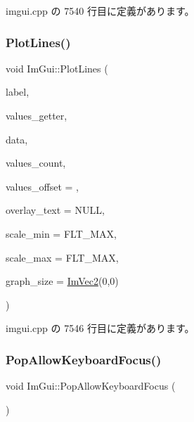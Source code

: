  imgui.\+cpp の 7540 行目に定義があります。

\mbox{\label{namespace_im_gui_a94a2645d45c96da35b834dc7db93a9f1}} 
\subsubsection{\texorpdfstring{Plot\+Lines()}{PlotLines()}\hspace{0.1cm}{\footnotesize\ttfamily [2/2]}}
{\footnotesize\ttfamily void Im\+Gui\+::\+Plot\+Lines (\begin{DoxyParamCaption}\item[{const char $\ast$}]{label,  }\item[{float($\ast$)(void $\ast$data, int idx)}]{values\+\_\+getter,  }\item[{void $\ast$}]{data,  }\item[{int}]{values\+\_\+count,  }\item[{int}]{values\+\_\+offset = {},  }\item[{const char $\ast$}]{overlay\+\_\+text = {\ttfamily NULL},  }\item[{float}]{scale\+\_\+min = {\ttfamily FLT\+\_\+MAX},  }\item[{float}]{scale\+\_\+max = {\ttfamily FLT\+\_\+MAX},  }\item[{\mbox{\hyperlink{struct_im_vec2}{Im\+Vec2}}}]{graph\+\_\+size = {\ttfamily \mbox{\hyperlink{struct_im_vec2}{Im\+Vec2}}(0,0)} }\end{DoxyParamCaption})}



 imgui.\+cpp の 7546 行目に定義があります。

\mbox{\label{namespace_im_gui_a017db69016de97685aec978e504dc96d}} 
\subsubsection{\texorpdfstring{Pop\+Allow\+Keyboard\+Focus()}{PopAllowKeyboardFocus()}}
{\footnotesize\ttfamily void Im\+Gui\+::\+Pop\+Allow\+Keyboard\+Focus (\begin{DoxyParamCaption}{ }\end{DoxyParamCaption})}



